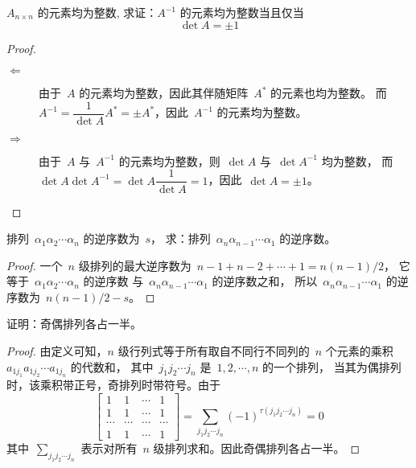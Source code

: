 \documentclass[twoside,openright]{book}
\begin{document}
\begin{CJK*}{UTF8}{}
\begin{quest}
\label{quest:64}
$A_{n \times n}$ 的元素均为整数, 求证：$A^{-1}$ 的元素均为整数当且仅当
\[
\det{A}=\pm1
\]
\end{quest}
\begin{proof}
$ $
\begin{description}
\item[$\Longleftarrow$]

由于\ $A$ 的元素均为整数，因此其伴随矩阵\ $A^*$ 的元素也均为整数。
而\ $A^{-1}=\dfrac{1}{\det{A}}A^*=\pm A^*$，因此\ $A^{-1}$ 的元素均为整数。
\item[$\Longrightarrow$]

由于\ $A$ 与\ $A^{-1}$ 的元素均为整数，则\ $\det{A}$ 与\ $\det{A^{-1}}$ 均为整数，
而\ $\det{A}\det{A^{-1}}=\det{A}\dfrac{1}{\det A}=1$，因此\ $\det{A}=\pm 1$。
\end{description}
\end{proof}

\begin{quest}
\label{quest:65}
排列\ $\alpha_1 \alpha_2 \dotsm \alpha_n$ 的逆序数为\ $s$，
求：排列\ $\alpha_n \alpha_{n-1} \dotsm \alpha_1$ 的逆序数。
\end{quest}
\begin{proof}
一个\ $n$ 级排列的最大逆序数为\ $n-1+n-2+\dotsb+1=n(n-1)/2$，
它等于\ $\alpha_1 \alpha_2 \dotsm \alpha_n$ 的逆序数
与\ $\alpha_n \alpha_{n-1} \dotsm \alpha_1$ 的逆序数之和，
所以\ $\alpha_n \alpha_{n-1} \dotsm \alpha_1$ 的逆序数为\ $n(n-1)/2-s$。
\end{proof}

\begin{quest}
\label{quest:66}
证明：奇偶排列各占一半。
\end{quest}
\begin{proof}
由定义可知，$n$ 级行列式等于所有取自不同行不同列的\ $n$ 个元素的乘积\ $a_{1j_1}a_{1j_2}\dotsm a_{1j_n}$ 的代数和，
其中\ $j_1j_2\dotsm j_n$ 是\ $1,2,\dotsm,n$ 的一个排列，
当其为偶排列时，该乘积带正号，奇排列时带符号。由于
\[
\begin{bmatrix}
1      & 1      & \dotsm & 1      \\
1      & 1      & \dotsm & 1      \\
\dotsm & \dotsm & \dotsm & \dotsm \\
1      & 1      & \dotsm & 1
\end{bmatrix}
=
\sum_{j_1 j_2 \dotsm j_n}(-1)^{\tau(j_1 j_2 \dotsm j_n)} = 0
\]
其中\ $\sum_{j_1 j_2 \dotsm j_n}$ 表示对所有\ $n$ 级排列求和。因此奇偶排列各占一半。
\end{proof}


\end{CJK*}
\end{document}
